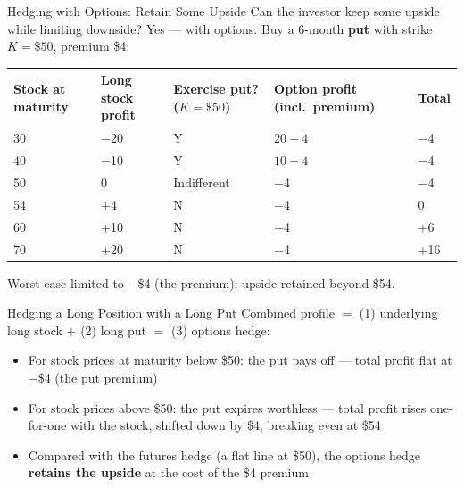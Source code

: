 \documentclass[aspectratio=169]{beamer}
\begin{document}
\begin{frame}{Hedging with Options: Retain Some Upside}
Can the investor keep some upside while limiting downside? Yes --- with options. Buy a 6-month \textbf{put} with strike $K = \$50$, premium \$4:
\begin{table}
\centering
\small
\begin{tabular}{p{}p{}p{}p{}p{}}
\toprule
\textbf{Stock at maturity} & \textbf{Long stock profit} & \textbf{Exercise put? ($K{=}\$50$)} & \textbf{Option profit (incl.\ premium)} & \textbf{Total} \\
\midrule
30 & $-$20 & Y & $20-4$ & $-$4 \\
40 & $-$10 & Y & $10-4$ & $-$4 \\
50 & 0 & Indifferent & $-$4 & $-$4 \\
54 & $+$4 & N & $-$4 & 0 \\
60 & $+$10 & N & $-$4 & $+$6 \\
70 & $+$20 & N & $-$4 & $+$16 \\
\bottomrule
\end{tabular}
\end{table}
Worst case limited to $-$\$4 (the premium); upside retained beyond \$54.
\end{frame}

\begin{frame}{Hedging a Long Position with a Long Put}
Combined profile $=$ (1) underlying long stock $+$ (2) long put $=$ (3) options hedge:
\begin{itemize}
  \item For stock prices at maturity below \$50: the put pays off --- total profit flat at $-$\$4 (the put premium)
  \item For stock prices above \$50: the put expires worthless --- total profit rises one-for-one with the stock, shifted down by \$4, breaking even at \$54
  \item Compared with the futures hedge (a flat line at \$50), the options hedge \textbf{retains the upside} at the cost of the \$4 premium
\end{itemize}
\end{frame}
\end{document}
